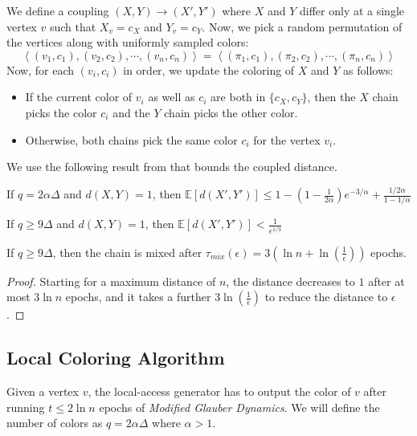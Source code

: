 We define a coupling $(X,Y)\rightarrow(X',Y')$ where $X$ and $Y$ differ only at a single vertex $v$ such that $X_v = c_X$ and $Y_v = c_Y$.
Now, we pick a random permutation of the vertices along with uniformly sampled colors:
\[
\left\langle (v_1, c_1), (v_2, c_2), \cdots, (v_n, c_n)\right\rangle
= \left\langle (\pi_1, c_1), (\pi_2, c_2), \cdots, (\pi_n, c_n)\right\rangle
\]
Now, for each $(v_i, c_i)$ in order, we update the coloring of $X$ and $Y$ as follows:
\begin{itemize}
    \item If the current color of $v_i$ as well as $c_i$ are both in $\{c_X,c_Y\}$,
    then the $X$ chain picks the color $c_i$ and the $Y$ chain picks the other color.
    \item Otherwise, both chains pick the same color $c_i$ for the vertex $v_i$.
\end{itemize}
We use the following result from \cite{mohsen} that bounds the coupled distance.
\begin{lemma}
\label{lem:mohsen_single_epoch_distance}
If $q = 2\alpha\Delta$ and $d(X, Y) = 1$, then $\mathbb E[d(X',Y')] \le 1-\left( 1-\frac1{2\alpha}\right)e^{-3/\alpha} + \frac{1/2\alpha}{1-1/\alpha}$
\end{lemma}
\begin{corollary}
\label{cor:single_epoch_distansce}
If $q \ge 9\Delta$ and $d(X, Y) = 1$, then $\mathbb E[d(X',Y')] < \frac1{e^{1/3}}$
\end{corollary}

\begin{theorem}
\label{thm:modified_mixing_time}
If $q\ge 9\Delta$, then the chain is mixed after $\tau_{mix}(\epsilon) = 3\left( \ln n + \ln(\frac1{\epsilon})\right)$ epochs.
\end{theorem}
\begin{proof}
Starting for a maximum distance of $n$, the distance decreases to $1$ after at most $3\ln n$ epochs,
and it takes a further $3\ln\left( \frac{1}{\epsilon} \right)$ to reduce the distance to $\epsilon$.
\end{proof}




\subsection{Local Coloring Algorithm}%
\label{sec:local_coloring_algortihm}
Given a vertex $v$, the local-access generator has to output the color of $v$ after running $t \le 2\ln n$ epochs of \emph{Modified Glauber Dynamics}.
We will define the number of colors as $q = 2\alpha\Delta$ where $\alpha > 1$.

